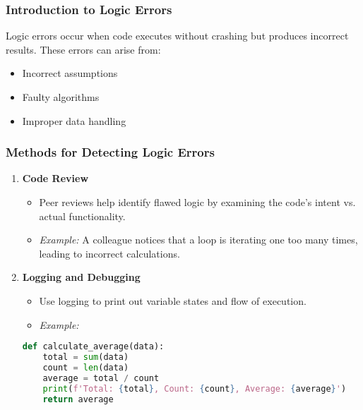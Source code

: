 \documentclass[aspectratio=169]{beamer}
\begin{document}
\begin{frame}[fragile]
    \frametitle{Introduction to Logic Errors}
    Logic errors occur when code executes without crashing but produces incorrect results. These errors can arise from:
    \begin{itemize}
        \item Incorrect assumptions
        \item Faulty algorithms
        \item Improper data handling
    \end{itemize}
\end{frame}

\begin{frame}[fragile]
    \frametitle{Methods for Detecting Logic Errors}
    \begin{enumerate}
        \item \textbf{Code Review}
        \begin{itemize}
            \item Peer reviews help identify flawed logic by examining the code's intent vs. actual functionality.
            \item \textit{Example:} A colleague notices that a loop is iterating one too many times, leading to incorrect calculations.
        \end{itemize}

        \item \textbf{Logging and Debugging}
        \begin{itemize}
            \item Use logging to print out variable states and flow of execution.
            \item \textit{Example:}
            \end{itemize}
            \begin{lstlisting}[language=Python]
def calculate_average(data):
    total = sum(data)
    count = len(data)
    average = total / count
    print(f'Total: {total}, Count: {count}, Average: {average}')
    return average
            \end{lstlisting}
    \end{enumerate}
\end{frame}
\end{document}
